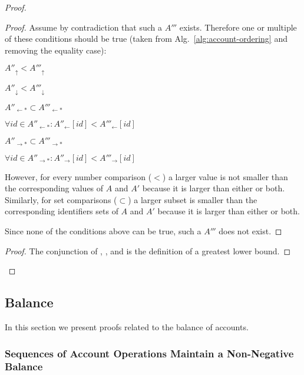 \documentclass[9pt]{article}   	%
\begin{document}
\begin{proof}
	\begin{proof}
		Assume by contradiction that such a $A'''$ exists. Therefore one or multiple of these conditions should be true (taken from Alg.~\ref{alg:account-ordering} and removing the equality case):
		\begin{pfenum}
			\item $A''_\uparrow < A'''_\uparrow$
			\item $A''_\downarrow < A'''_\downarrow$
			\item $A''_{\leftarrow *} \subset A'''_{\leftarrow *}$
			\item $\forall id \in A''_{\leftarrow *} : A''_{\leftarrow}[id] < A'''_{\leftarrow}[id] $
			\item $A''_{\rightarrow *} \subset A'''_{\rightarrow *}$  
			\item $\forall id \in A''_{\rightarrow *} : A''_{\rightarrow}[id] < A'''_{\rightarrow}[id] $
		\end{pfenum}
		However, for every number comparison ($<$) a larger value is not smaller than the corresponding values of $A$ and $A'$ because it is larger than either or both. Similarly, for set comparisons ($\subset$) a larger subset is smaller than the corresponding identifiers sets of $A$ and $A'$ because it is larger than either or both.
		
		Since none of the conditions above can be true, such a $A'''$ does not exist.
	\end{proof}
	
	\qedstep
	\begin{proof}
		The conjunction of , , and  is the definition of a greatest lower bound.
	\end{proof}
\end{proof}



\subsection{Balance}
\label{sec:proof:balance}

In this section we present proofs related to the balance of accounts.

\subsubsection{Sequences of Account Operations Maintain a Non-Negative Balance}
\label{section:proof:sequential-non-negative}
\end{document}
